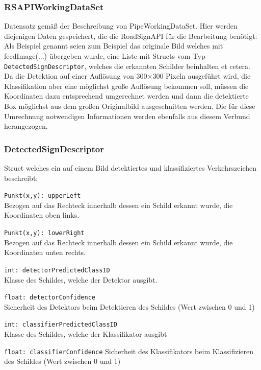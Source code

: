 \documentclass[12pt,a4paper,ngerman,enabledeprecatedfontcommands]{scrreprt}
\begin{document}
\subsubsection*{RSAPIWorkingDataSet}
Datensatz gemäß der Beschreibung von PipeWorkingDataSet. Hier werden diejenigen Daten gespeichert, die die RoadSignAPI für die Bearbeitung benötigt: Als Beispiel genannt seien zum Beispiel das originale Bild welches mit feedImage(...) übergeben wurde, eine Liste mit Structs vom Typ \texttt{DetectedSignDescriptor}, welches die erkannten Schilder beinhalten et cetera.  Da die \gls{Detektion} auf einer Auflösung von 300$\times$300 Pixeln ausgeführt wird, die \gls{Klassifikation} aber eine möglichst große Auflösung bekommen soll, müssen die Koordinaten dazu entsprechend umgerechnet werden und dann die detektierte Box möglichst aus dem großen Originalbild ausgeschnitten werden. Die für diese Umrechnung notwendigen Informationen werden ebenfalls aus diesem Verbund herangezogen.\\

\subsubsection{DetectedSignDescriptor}
Struct welches ein auf einem Bild detektiertes und klassifiziertes Verkehrszeichen beschreibt:
\begin{description}
\item \texttt{Punkt(x,y): upperLeft} \\ Bezogen auf das Rechteck innerhalb dessen ein Schild erkannt wurde, die Koordinaten oben links.
\item \texttt{Punkt(x,y): lowerRight} \\ Bezogen auf das Rechteck innerhalb dessen ein Schild erkannt wurde, die Koordinaten unten rechts.\\
\item \texttt{int: detectorPredictedClassID} \\ Klasse des Schildes, welche der Detektor ausgibt.
\item \texttt{float: detectorConfidence} \\ Sicherheit des Detektors beim Detektieren des Schildes (Wert zwischen 0 und 1)
\item \texttt{int: classifierPredictedClassID} \\ Klasse des Schildes, welche der Klassifikator ausgibt\
\item \texttt{float: classifierConfidence} Sicherheit des Klassifikators beim Klassifizieren des Schildes (Wert zwischen 0 und 1)\\
\end{description}
\end{document}
